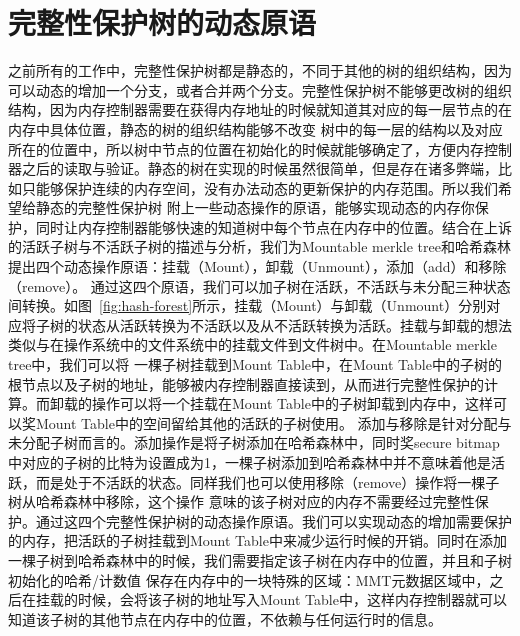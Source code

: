 \section{完整性保护树的动态原语}
之前所有的工作中，完整性保护树都是静态的，不同于其他的树的组织结构，因为可以动态的增加一个分支，或者合并两个分支。完整性保护树不能够更改树的组织结构，因为内存控制器需要在获得内存地址的时候就知道其对应的每一层节点的在内存中具体位置，静态的树的组织结构能够不改变
树中的每一层的结构以及对应所在的位置中，所以树中节点的位置在初始化的时候就能够确定了，方便内存控制器之后的读取与验证。静态的树在实现的时候虽然很简单，但是存在诸多弊端，比如只能够保护连续的内存空间，没有办法动态的更新保护的内存范围。所以我们希望给静态的完整性保护树
附上一些动态操作的原语，能够实现动态的内存你保护，同时让内存控制器能够快速的知道树中每个节点在内存中的位置。结合在上诉的活跃子树与不活跃子树的描述与分析，我们为Mountable merkle tree和哈希森林提出四个动态操作原语：挂载（Mount），卸载（Unmount），添加（add）和移除（remove）。
通过这四个原语，我们可以加子树在活跃，不活跃与未分配三种状态间转换。如图~\ref{fig:hash-forest}所示，挂载（Mount）与卸载（Unmount）分别对应将子树的状态从活跃转换为不活跃以及从不活跃转换为活跃。挂载与卸载的想法类似与在操作系统中的文件系统中的挂载文件到文件树中。在Mountable merkle tree中，我们可以将
一棵子树挂载到Mount Table中，在Mount Table中的子树的根节点以及子树的地址，能够被内存控制器直接读到，从而进行完整性保护的计算。而卸载的操作可以将一个挂载在Mount Table中的子树卸载到内存中，这样可以奖Mount Table中的空间留给其他的活跃的子树使用。
添加与移除是针对分配与未分配子树而言的。添加操作是将子树添加在哈希森林中，同时奖secure bitmap中对应的子树的比特为设置成为1，一棵子树添加到哈希森林中并不意味着他是活跃，而是处于不活跃的状态。同样我们也可以使用移除（remove）操作将一棵子树从哈希森林中移除，这个操作
意味的该子树对应的内存不需要经过完整性保护。通过这四个完整性保护树的动态操作原语。我们可以实现动态的增加需要保护的内存，把活跃的子树挂载到Mount  Table中来减少运行时候的开销。同时在添加一棵子树到哈希森林中的时候，我们需要指定该子树在内存中的位置，并且和子树初始化的哈希/计数值
保存在内存中的一块特殊的区域：MMT元数据区域中，之后在挂载的时候，会将该子树的地址写入Mount Table中，这样内存控制器就可以知道该子树的其他节点在内存中的位置，不依赖与任何运行时的信息。

